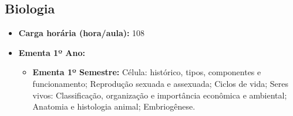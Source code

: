 \documentclass[11pt,fleqn]{book} %
\begin{document}
\subsection{Biologia}\label{disc:biologia}
\begin{itemize}
	\item \textbf{Carga horária (hora/aula):} 108
	\item \textbf{Ementa 1º Ano:}
	\begin{itemize}
		\item \textbf{Ementa 1º Semestre:} 
		Célula: histórico, tipos, componentes e funcionamento; 
		Reprodução sexuada e assexuada; 
		Ciclos de vida; 
		Seres vivos: Classificação, organização e importância econômica e ambiental; 
		Anatomia e histologia animal;
		Embriogênese.
		

\end{itemize}
\end{itemize}
\end{document}
